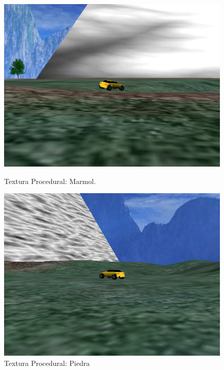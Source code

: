 \documentclass[a4paper,10pt]{article}
\begin{document}
\begin{figure}
\begin{minipage}[b]{0.5\linewidth}
\centering
 \includegraphics[scale=0.250]{./marble.png}
 \caption{Textura Procedural: Marmol.}
\label{fig:figure5}
\end{minipage}
\hspace{0.5cm}
\begin{minipage}[b]{0.5\linewidth}
\centering
 \includegraphics[scale=0.250]{./stone.png}
 \caption{Textura Procedural: Piedra}
\label{fig:figure6}
\end{minipage}
\end{figure}
\end{document}
